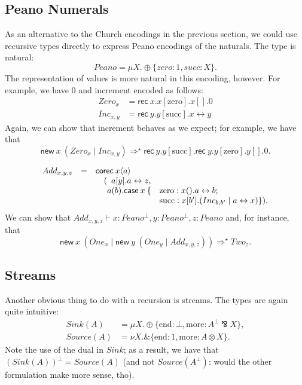\documentclass[orivec,envcountsame]{llncs}
\newcommand{\with}{\mathbin\binampersand}
\newcommand{\parr}{\mathbin\bindnasrepma}
\newcommand{\cpdual}[1]{#1^\perp}
\newcommand{\cptyp}[2]{#1 \vdash #2}
\newcommand{\mkwd}[1]{\mathsf{#1}}
\newcommand{\link}[2]{#1 \leftrightarrow #2}
\newcommand{\cut}[4]{\mkwd{new}\:#1 \: (#3 \mid #4)}
\newcommand{\rec}[1]{\mkwd{rec}\:#1}
\newcommand{\clabel}[1]{\mathrm{#1}}
\newcommand{\sel}[2]{#1[\clabel{#2}]}
\begin{document}
\subsection{Peano Numerals}

As an alternative to the Church encodings in the previous section, we could use recursive types
directly to express Peano encodings of the naturals.  The type is natural:
%
{\small\[
  Peano = \mu X.\oplus\{zero: 1, succ: X\}.
\]}
%
The representation of values is more natural in this encoding, however.  For example, we have 0 and
increment encoded as follows:
%
{\small\begin{align*}
  Zero_x &= \rec{x}.\sel{x}{zero}.x[].0 \\
  Inc_{x,y} &= \rec{y}.\sel{y}{succ}.\link{x}{y}
\end{align*}}
Again, we can show that increment behaves as we expect; for example, we have that
%
{\small\[
  \cut{x}{Peano}{Zero_x}{Inc_{x,y}} \Longrightarrow^\star \rec{y}.\sel{y}{succ}.\rec{y}.\sel{y}{zero}.y[].0.
\]}

{\small\[\begin{array}{rcl@{\hspace{0mm}}ll}
  Add_{x,y,z} & = & \multicolumn{3}{l}{\mkwd{corec}\:x\langle a \rangle} \\
  & & \quad (&\multicolumn{2}{l}{a[y].\link{a}{z},} \\
  & & & a(b).\mkwd{case}\:x\:\{&\clabel{zero}: x().\link{a}{b}; \\
  & & & & \clabel{succ}: x[b'].(Inc_{b,b'} \mid  \link{a}{x}) \}).
\end{array}\]}
We can show that $\cptyp{Add_{x,y,z}}{x:\cpdual{Peano}, y:\cpdual{Peano}, z:Peano}$ and, for instance,
that
%
{\small\[
  \cut{x}{Peano}{One_x}{\cut{y}{Peano}{One_y}{Add_{x,y,z}}} \Longrightarrow^\star Two_z.
\]}

\subsection{Streams}

Another obvious thing to do with a recursion is streams.  The types are again quite intuitive:
{\small\begin{align*}
  Sink(A) &= \mu X. \oplus \{ \clabel{end}: \bot, \clabel{more}: \cpdual{A} \parr X \}, \\
  Source(A) &= \nu X. \with \{ \clabel{end}: 1, \clabel{more}: A \otimes X \}.
\end{align*}}
Note the use of the dual in $Sink$; as a result, we have that $\cpdual{(Sink(A))} = Source(A)$ (and
not $Source(\cpdual{A})$: would the other formulation make more sense, tho).
\end{document}
